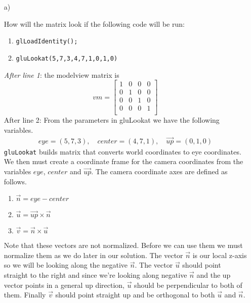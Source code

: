 \begin{itemize}
    
    \item[a)]
    {
    How will the matrix look if the following code will be run:
    \begin{enumerate}
        \item \texttt{glLoadIdentity();}
        \item \texttt{gluLookat(5,7,3,4,7,1,0,1,0)}
        \end{enumerate}
        \emph{After line 1}: the modelview matrix is
        \begin{equation}
            vm =
            \begin{bmatrix}
            1 & 0 & 0 & 0\\
            0 & 1 & 0 & 0\\
            0 & 0 & 1 & 0\\
            0 & 0 & 0 & 1\\
            \end{bmatrix}
        \end{equation}
        After line 2: From the parameters in gluLookat we have the following
        variables.
        \begin{eqnarray}
            eye = (5,7,3), \quad center=(4,7,1), \quad \vec{up}=(0,1,0)
        \end{eqnarray}
        \texttt{gluLookat} builds matrix that converts world coordinates to eye coordinates.
        We then must create a coordinate frame for the camera coordinates from the variables
        $eye$, $center$ and $\vec{up}$. The camera coordinate axes are defined as follows.
        \begin{enumerate}
            \item $\vec{n} = eye - center$
            \item $\vec{u} = \vec{up} \times \vec{n}$
            \item $\vec{v}= \vec{n} \times \vec{u}$
        \end{enumerate}
        Note that these vectors are not normalized. Before we can use them we must normalize them
        as we do later in our solution. 
        The vector $\vec{n}$ is our local z-axis so we will be looking along the negative $\vec{n}$.
        The vector $\vec{u}$ should point straight to the right and since we’re looking
        along negative $\vec{n}$ and the up vector points in a general up direction, $\vec{u}$
        should be perpendicular to both of them.
        Finally $\vec{v}$ should point straight up and be orthogonal to both $\vec{u}$ and $\vec{n}$.

}
\end{itemize}
